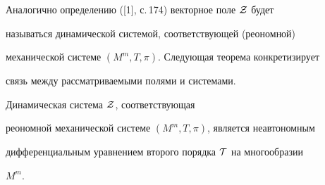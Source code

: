  


Аналогично определению ([1], с.\,174) векторное поле $\cal Z$ будет 


называться динамической системой, соответствующей (реономной) 


механической системе $(M^m,T,\pi)$. Следующая теорема конкретизирует 


связь между рассматриваемыми полями и системами. 


 


\begin{thm} 


Динамическая система $\cal Z$, соответствующая 


реономной механической системе $(M^m,T,\pi)$, является неавтономным 


дифференциальным уравнением второго порядка $\cal T$ на многообразии 


$M^m$. 


\end{thm} 


 



